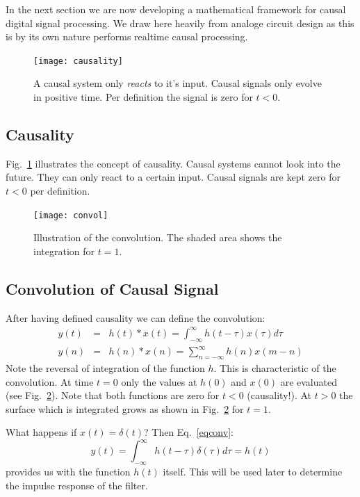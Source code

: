 \documentclass[12pt,a4paper]{article}
\begin{document}
In the next section we are now developing a mathematical
framework for causal digital signal processing. We draw
here heavily from analoge circuit design as this is by
its own nature performs realtime causal processing.


\begin{figure}[!hbt]
\begin{center}
\mbox{\texttt{[image: causality]}}
\end{center}
\caption{A causal system only \textsl{reacts} to it's input.
Causal signals only evolve in positive time. Per definition the
signal is zero for $t<0$.
\label{causality}}
\end{figure}


\subsection{Causality}
Fig.~\ref{causality} illustrates the concept of causality.
Causal systems cannot look into the future. They can only react
to a certain input. Causal signals are kept zero for $t<0$
per definition.

\begin{figure}[!hbt]
\begin{center}
\mbox{\texttt{[image: convol]}}
\end{center}
\caption{Illustration of the convolution. The shaded area
shows the integration for $t=1$.
\label{convolution}}
\end{figure}




\subsection{Convolution of Causal Signal}
After having defined causality we can define the convolution:
\begin{eqnarray} 
  y(t) & = & h(t) * x(t) = \int_{-\infty}^{\infty} h(t - \tau) x(\tau) d\tau \\
  y(n) & = & h(n) * x(n) = \sum_{n = -\infty}^\infty h(n) x(m - n)
\label{eqconv}
\end{eqnarray}
Note the reversal of integration of the function $h$. This
is characteristic of the convolution. At time $t=0$
only the values at $h(0)$ and $x(0)$ are evaluated 
(see Fig.~\ref{convolution}). Note
that both functions are zero for $t<0$ (causality!).
At $t>0$ the surface which is integrated grows as shown
in Fig.~\ref{convolution} for $t=1$.

What happens if $x(t)=\delta(t)$? Then Eq.~\ref{eqconv}:
\begin{equation} 
y(t) = \int_{-\infty}^{\infty} h(t - \tau) \delta(\tau) d\tau = h(t)
\label{convdelta}
\end{equation}
provides us with the function $h(t)$ itself. This will
be used later to determine the impulse response of the
filter.
\end{document}
